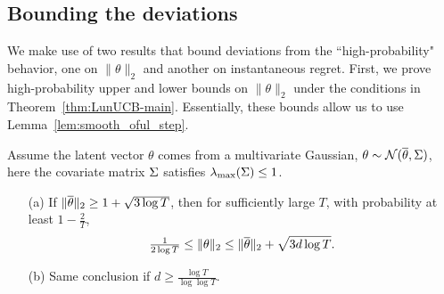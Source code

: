 \subsection{Bounding the deviations}
\label{app:linucb-deviations}

We make use of two results that bound deviations from the ``high-probability" behavior, one on $\|\theta\|_2$ and another on instantaneous regret. First, we prove high-probability upper and lower bounds on $\|\theta\|_2$ under the conditions in Theorem~\ref{thm:LunUCB-main}. Essentially, these bounds allow us to use Lemma~\ref{lem:smooth_oful_step}.

\begin{lemma}\label{lem:smooth_oful_ex}
Assume the latent vector $\theta$ comes from a multivariate Gaussian,
    $\theta \sim \mathcal{N}(\overline \theta, \Sigma)$,
here the covariate matrix $\Sigma$ satisfies $\lambda_{\max}(\Sigma) \le 1$.
\begin{itemize}
\item[(a)] If $\|\overline \theta\|_2 \ge 1+\sqrt{3\log T}$,  then
  for sufficiently large $T$, with probability at least $1-\frac{2}{T}$,
  \begin{align}\label{eq:lem:smooth_oful_ex}
    \tfrac{1}{2\log T} \le \|\theta\|_2 \le \|\overline \theta\|_2 + \sqrt{3d \log T}.
  \end{align}
\item[(b)] Same conclusion if $d \ge \frac{\log T}{\log \log T}$.
\end{itemize}
\end{lemma}
